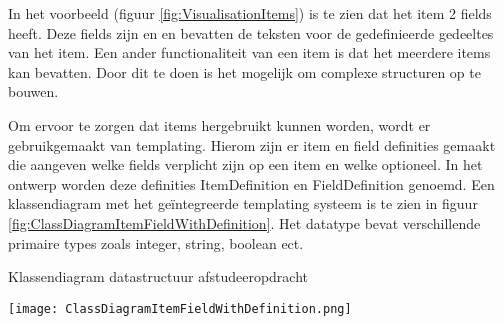 \whitespace
In het voorbeeld (figuur \ref{fig:VisualisationItems}) is te zien dat het item  2 fields heeft.
Deze fields zijn  en  en bevatten de teksten voor de gedefinieerde gedeeltes van het item.
Een ander functionaliteit van een item is dat het meerdere items kan bevatten. 
Door dit te doen is het mogelijk om complexe structuren op te bouwen.

\whitespace
Om ervoor te zorgen dat items hergebruikt kunnen worden, wordt er gebruikgemaakt van templating.
Hierom zijn er item en field definities gemaakt die aangeven welke fields verplicht zijn op een item en welke optioneel.
In het ontwerp worden deze definities ItemDefinition en FieldDefinition genoemd.
Een klassendiagram met het geïntegreerde templating systeem is te zien in figuur \ref{fig:ClassDiagramItemFieldWithDefinition}.
Het datatype  bevat verschillende primaire types zoals integer, string, boolean ect.

\whitespace[2]
\begin{graphic}
    \captionsetup{type=figure}
    \caption{Klassendiagram datastructuur afstudeeropdracht}
    \texttt{[image: ClassDiagramItemFieldWithDefinition.png]}
    \label{fig:ClassDiagramItemFieldWithDefinition}
\end{graphic}

